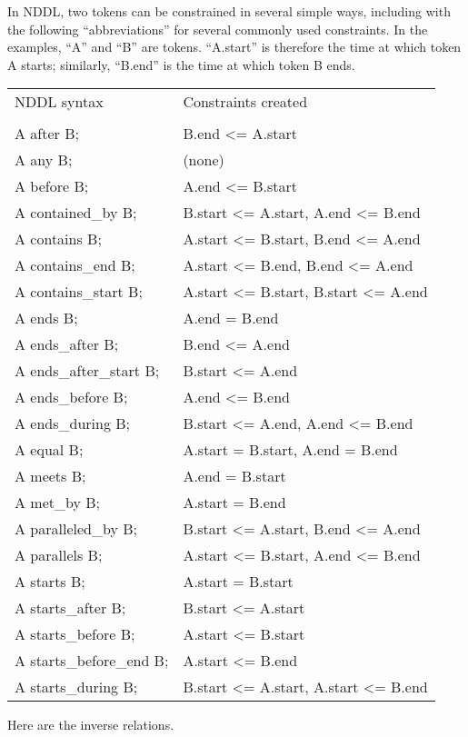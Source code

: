 \documentclass[10pt, letterpaper, twoside]{article}
\begin{document}
In NDDL, two tokens can be constrained in several simple ways,
including with the following ``abbreviations'' for several commonly
used constraints.  In the examples, ``A'' and ``B'' are tokens.
``A.start'' is therefore the time at which token A starts; similarly,
``B.end'' is the time at which token B ends.

\begin{tabular}{ll}
NDDL syntax & Constraints created \\
\cline{1-2} \\
A after B; & B.end <= A.start \\
A any B; & (none) \\
A before B; & A.end <= B.start \\
A contained\_by B; & B.start <= A.start, A.end <= B.end \\
A contains B; & A.start <= B.start, B.end <= A.end \\
A contains\_end B; & A.start <= B.end, B.end <= A.end \\
A contains\_start B; & A.start <= B.start, B.start <= A.end \\
A ends B; & A.end = B.end \\
A ends\_after B; & B.end <= A.end \\
A ends\_after\_start B; & B.start <= A.end \\
A ends\_before B; & A.end <= B.end \\
A ends\_during B; & B.start <= A.end, A.end <= B.end \\
A equal B; & A.start = B.start, A.end = B.end \\
A meets B; & A.end = B.start \\
A met\_by B; & A.start = B.end \\
A paralleled\_by B; & B.start <= A.start, B.end <= A.end \\
A parallels B; & A.start <= B.start, A.end <= B.end \\
A starts B; & A.start = B.start \\
A starts\_after B; & B.start <= A.start \\
A starts\_before B; & A.start <= B.start \\
A starts\_before\_end B; & A.start <= B.end \\
A starts\_during B; & B.start <= A.start, A.start <= B.end \\
\end{tabular}

Here are the inverse relations.
\end{document}
